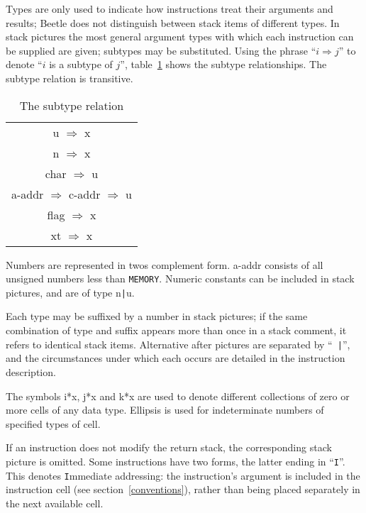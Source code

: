 \documentclass{article}
\newcommand{\spic}[1]{{\spfont \setlength{\baselineskip}{\normalbaselineskip} #1\/}}
\begin{document}
Types are only used to indicate how instructions treat their arguments and
results; Beetle does not distinguish between stack items of different types. In
stack pictures the most general argument types with which each instruction can
be supplied are given; subtypes may be substituted. Using the phrase ``$i
\Rightarrow j$'' to denote ``$i$\/ is a subtype of $j$\/'', table~\ref{reltable}
shows the subtype relationships. The subtype relation is transitive.

\begin{table}[htbp]
\begin{center}
\begin{tabular}{|c|} \hline
\spic{u} $\Rightarrow$ \spic{x} \\
\spic{n} $\Rightarrow$ \spic{x} \\
\spic{char} $\Rightarrow$ \spic{u} \\
\spic{a-addr} $\Rightarrow$ \spic{c-addr} $\Rightarrow$ \spic{u} \\
\spic{flag} $\Rightarrow$ \spic{x} \\
\spic{xt} $\Rightarrow$ \spic{x} \\ \hline
\end{tabular}
\end{center}
\vspace{-2mm}
\caption{\label{reltable}The subtype relation}
\end{table}

Numbers are represented in twos complement form. \spic{a-addr} consists of all
unsigned numbers less than {\tt MEMORY}. Numeric constants can be included in
stack pictures, and are of type \spic{n{\tt |}u}.

Each type may be suffixed by a number in stack pictures; if the same combination
of type and suffix appears more than once in a stack comment, it refers to
identical stack items. Alternative \spic{after} pictures are separated by ``{\tt
|}'', and the circumstances under which each occurs are detailed in the
instruction description.

The symbols \spic{i*x}, \spic{j*x} and \spic{k*x} are used to denote different
collections of zero or more cells of any data type. Ellipsis is used for
indeterminate numbers of specified types of cell.

If an instruction does not modify the return stack, the corresponding stack
picture is omitted. Some instructions have two forms, the latter ending in
``{\tt I}''. This denotes {\tt I}mmediate addressing: the instruction's argument
is included in the instruction cell (see section~\ref{conventions}), rather than
being placed separately in the next available cell.
\end{document}
